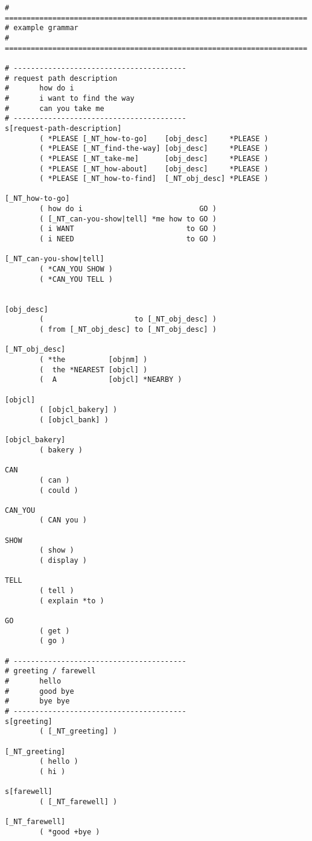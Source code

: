 \begin{verbatim}
# ======================================================================
# example grammar
# ======================================================================

# ----------------------------------------
# request path description
#       how do i
#       i want to find the way
#       can you take me
# ----------------------------------------
s[request-path-description]
        ( *PLEASE [_NT_how-to-go]    [obj_desc]     *PLEASE )
        ( *PLEASE [_NT_find-the-way] [obj_desc]     *PLEASE )
        ( *PLEASE [_NT_take-me]      [obj_desc]     *PLEASE )
        ( *PLEASE [_NT_how-about]    [obj_desc]     *PLEASE )
        ( *PLEASE [_NT_how-to-find]  [_NT_obj_desc] *PLEASE )

[_NT_how-to-go]
        ( how do i                           GO )
        ( [_NT_can-you-show|tell] *me how to GO )
        ( i WANT                          to GO )
        ( i NEED                          to GO )

[_NT_can-you-show|tell]
        ( *CAN_YOU SHOW )
        ( *CAN_YOU TELL )


[obj_desc]
        (                     to [_NT_obj_desc] )
        ( from [_NT_obj_desc] to [_NT_obj_desc] )

[_NT_obj_desc]
        ( *the          [objnm] )
        (  the *NEAREST [objcl] )
        (  A            [objcl] *NEARBY )

[objcl]
        ( [objcl_bakery] )
        ( [objcl_bank] )

[objcl_bakery]
        ( bakery )

CAN
        ( can )
        ( could )

CAN_YOU
        ( CAN you )

SHOW
        ( show )
        ( display )

TELL
        ( tell )
        ( explain *to )

GO
        ( get )
        ( go )

# ----------------------------------------
# greeting / farewell
#       hello
#       good bye
#       bye bye
# ----------------------------------------
s[greeting]
        ( [_NT_greeting] )

[_NT_greeting]
        ( hello )
        ( hi )

s[farewell]
        ( [_NT_farewell] )

[_NT_farewell]
        ( *good +bye )
\end{verbatim}

